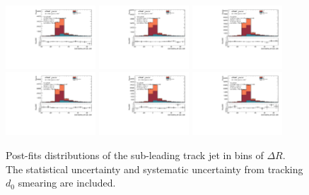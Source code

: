 \begin{figure}[htbp]
  \centering
 \includegraphics[width=0.3\textwidth]{figures/gbb/Sub_Sd0_Fits/Canv_Fit_02-DeltaR-025_coarse_y.pdf}
 \includegraphics[width=0.3\textwidth]{figures/gbb/Sub_Sd0_Fits/Canv_Fit_025-DeltaR-03_coarse_y.pdf}
 \includegraphics[width=0.3\textwidth]{figures/gbb/Sub_Sd0_Fits/Canv_Fit_03-DeltaR-04_coarse_y.pdf}\\
 \includegraphics[width=0.3\textwidth]{figures/gbb/Sub_Sd0_Fits/Canv_Fit_04-DeltaR-05_coarse_y.pdf}
 \includegraphics[width=0.3\textwidth]{figures/gbb/Sub_Sd0_Fits/Canv_Fit_05-DeltaR-06_coarse_y.pdf}
 \includegraphics[width=0.3\textwidth]{figures/gbb/Sub_Sd0_Fits/Canv_Fit_06-DeltaR-07_coarse_y.pdf}\\

\caption{Post-fits \subsdzero distributions of the sub-leading track jet in bins of $\Delta R$. The statistical uncertainty and systematic uncertainty from tracking $d_0$ smearing are included.}
  \label{fig:dR-postfits-subleading-sub}
\end{figure}


